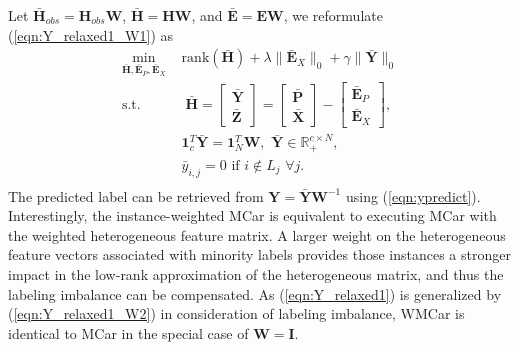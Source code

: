 \documentclass[10pt,journal,compsoc]{IEEEtran}
\begin{document}
Let $\bar{\mathbf{H}}_{obs} = \mathbf{H}_{obs} \mathbf{W}$, $\bar{\mathbf{H}} = \mathbf{H} \mathbf{W}$, and $\bar{\mathbf{E}} = \mathbf{E} \mathbf{W}$, we reformulate (\ref{eqn:Y_relaxed1_W1}) as
\begin{equation}
\begin{aligned}
 \min_{\bar{\mathbf{H}}, \bar{\mathbf{E}}_P, \bar{\mathbf{E}}_X} \,\, & \mathrm{rank} (\bar{\mathbf{H}}) + \lambda \|\bar{\mathbf{E}}_X \|_0  +  \gamma \|\bar{\mathbf{Y}} \|_0\\
 \text{s.t.} & \;
{\bar{\mathbf{H}}}= \begin{bmatrix}
\bar{\mathbf{Y}}\\
\bar{\mathbf{Z}}
\end{bmatrix}= \begin{bmatrix}
\bar{\mathbf{P}}\\
\bar{\mathbf{X}}
\end{bmatrix} - \begin{bmatrix}
\bar{\mathbf{E}}_P \\
\bar{\mathbf{E}}_X
\end{bmatrix},\\
& \mathbf{1}^T_c \bar{\mathbf{Y}} = \mathbf{1}^T_N\mathbf{W}, \,\, \bar{\mathbf{Y}} \in \mathbb{R}_+^{c \times N}, \\
& \bar{y}_{i,j} = 0 \,\, \mathrm{if} \,\, i \notin L_j \,\, \forall j. \\
\end{aligned}\label{eqn:Y_relaxed1_W2}
\end{equation}
The predicted label can be retrieved from $\mathbf{Y} = \bar{\mathbf{Y}} \mathbf{W}^{-1}$ using (\ref{eqn:ypredict}).
Interestingly, the instance-weighted MCar is equivalent to executing MCar with the weighted heterogeneous feature matrix.
A larger weight on the heterogeneous feature vectors associated with minority labels provides those instances a stronger impact in the low-rank approximation of the heterogeneous matrix, and thus the labeling imbalance can be compensated.
As (\ref{eqn:Y_relaxed1}) is generalized by (\ref{eqn:Y_relaxed1_W2}) in consideration of labeling imbalance, WMCar is identical to MCar in the special case of $\mathbf{W} = \mathbf{I}$.
\end{document}
